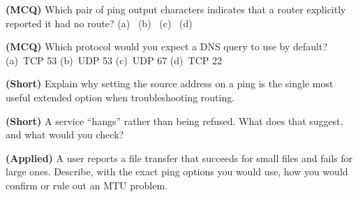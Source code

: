 \begin{reviewq}
  \item \textbf{(MCQ)} Which pair of ping output characters indicates that a
        router explicitly reported it had no route?
        (a)~ (b)~ (c)~\cmd{!!!!!} (d)~
  \item \textbf{(MCQ)} Which protocol would you expect a DNS query to use by
        default? (a)~TCP 53 (b)~UDP 53 (c)~UDP 67 (d)~TCP 22
  \item \textbf{(Short)} Explain why setting the source address on a ping is the
        single most useful extended option when troubleshooting routing.
  \item \textbf{(Short)} A service ``hangs'' rather than being refused. What does
        that suggest, and what would you check?
  \item \textbf{(Applied)} A user reports a file transfer that succeeds for small
        files and fails for large ones. Describe, with the exact ping options you
        would use, how you would confirm or rule out an MTU problem.
\end{reviewq}
